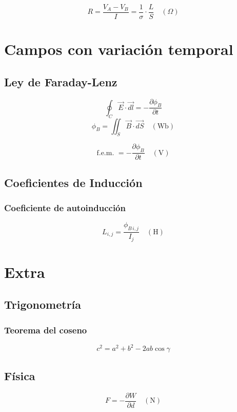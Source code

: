 \documentclass[12pt,a4paper]{article}
\begin{document}
\[ R = \frac{V_A - V_B}{I} = \frac{1}{\sigma} \cdot \frac{L}{S} \quad (\Omega) \]

\section{Campos con variación temporal}
\label{sec:campos_con_variacion_temporal}

\subsection{Ley de Faraday-Lenz}
\label{sub:ley_de_faraday_lenz}

\[ \oint_C \vec{E} \cdot \vec{dl} = - \frac{\partial \phi_B}{\partial t} \]
\[ \phi_B = \iint_S \vec{B} \cdot \vec{dS} \quad ( \mbox{Wb} ) \]

\[ \mbox{f.e.m. } = - \frac{\partial \phi_B}{\partial t} \quad ( \mbox{V} ) \]

\subsection{Coeficientes de Inducción}
\label{sub:coeficientes_de_induccion}

\subsubsection{Coeficiente de autoinducción}
\label{ssub:coeficiente_de_autoinduccion}

\[ L_{i,j} = \frac{\phi_{B\,i,j}}{I_j} \quad ( \mbox{H} ) \]

\section{Extra}
\label{sec:extra}

\subsection{Trigonometría}
\label{sub:trigonometria}

\subsubsection{Teorema del coseno}
\label{ssub:teorema_del_coseno}

\[ c^2 = a^2 + b^2 - 2ab\cos\gamma \]

\subsection{Física}
\label{sub:fisica}

\[ F = - \frac{\partial W}{\partial d} \quad ( \mbox{N} ) \]
\end{document}
